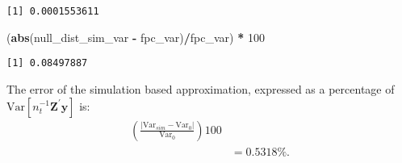 \documentclass[
  12pt,
  leqno]{article}
\newenvironment{Shaded}{\begin{snugshade}}{\end{snugshade}}
\newcommand{\ControlFlowTok}[1]{\textcolor[rgb]{0.13,0.29,0.53}{\textbf{#1}}}
\newcommand{\DataTypeTok}[1]{\textcolor[rgb]{0.13,0.29,0.53}{#1}}
\newcommand{\DecValTok}[1]{\textcolor[rgb]{0.00,0.00,0.81}{#1}}
\newcommand{\KeywordTok}[1]{\textcolor[rgb]{0.13,0.29,0.53}{\textbf{#1}}}
\newcommand{\NormalTok}[1]{#1}
\newcommand{\OperatorTok}[1]{\textcolor[rgb]{0.81,0.36,0.00}{\textbf{#1}}}
\newcommand{\StringTok}[1]{\textcolor[rgb]{0.31,0.60,0.02}{#1}}
\begin{document}
\begin{Shaded}
\end{Shaded}

\begin{verbatim}
[1] 0.0001553611
\end{verbatim}

\begin{Shaded}
\begin{Highlighting}[]
\NormalTok{(}\KeywordTok{abs}\NormalTok{(null\_dist\_sim\_var }\OperatorTok{{-}}\StringTok{ }\NormalTok{fpc\_var)}\OperatorTok{/}\NormalTok{fpc\_var) }\OperatorTok{*}\StringTok{ }\DecValTok{100}
\end{Highlighting}
\end{Shaded}

\begin{verbatim}
[1] 0.08497887
\end{verbatim}

The error of the simulation based approximation, expressed as a
percentage of
\(\mathrm{Var}\left[n_t^{-1} \mathbf{Z}^{\prime} \mathbf{y}\right]\) is:
\begin{align*}
\left(\frac{\left|\mathrm{Var}_{sim} - \mathrm{Var}_0\right|}{\mathrm{Var}_0}\right) 100 \\
& = 0.5318 \%.
\end{align*}
\end{document}
